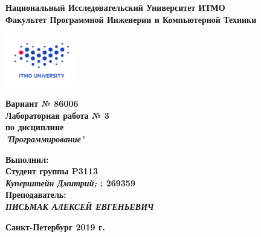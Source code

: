 \documentclass[11pt]{article}
\author{АВТОР}
\date{\today}
\title{}
\begin{document}
\thispagestyle{empty}
\begin{center}
\textbf{Национальный Исследовательский Университет ИТМО}\\
\textbf{Факультет Программной Инженерии и Компьютерной Техники}\\
\end{center}
\vspace{2em}
\begin{center}
\includegraphics[width=120px]{../../../itmo-logo.png}
\end{center}
\LARGE
\vspace{5em}
\begin{center}
\textbf{Вариант № 86006}\\
\textbf{Лабораторная работа № 3}\\
\Large
\textbf{по дисциплине}\\
\LARGE
\textbf{\emph{'Программирование'}}\\
\end{center}
\vspace{11em}
\large
\begin{flushright}
\textbf{Выполнил:}\\
\textbf{Студент группы P3113}\\
\textbf{\emph{Куперштейн Дмитрий;} : 269359}\\
\textbf{Преподаватель:}\\
\textbf{\emph{ПИСЬМАК АЛЕКСЕЙ ЕВГЕНЬЕВИЧ}}\\
\end{flushright}
\vspace{4em}
\large
\begin{center}
\textbf{Санкт-Петербург 2019 г.}
\end{center}
\pagebreak{}
\setcounter{tocdepth}{2}
\tableofcontents
\vspace{2em}
\pagebreak
\large
\end{document}
